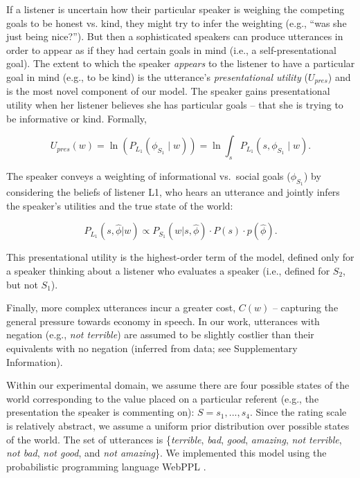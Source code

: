 \documentclass[9pt,twocolumn,twoside,lineno]{main_class_file}
\begin{document}
If a listener is uncertain how their particular speaker is weighing the competing goals to be honest vs. kind, they might try to infer the weighting (e.g., ``was she just being nice?''). 
But then a sophisticated speakers can produce utterances in order to appear as if they had certain goals in mind (i.e., a self-presentational goal). 
The extent to which the speaker \emph{appears} to the listener to have a particular goal in mind (e.g., to be kind) is the utterance's \emph{presentational utility} (\(U_{pres}\)) and is the most novel component of our model.
The speaker gains presentational utility when her listener believes she
has particular goals -- that she is trying to be informative or kind.
Formally,

\begin{equation}
U_{pres}(w) = \ln(P_{L_1}(\phi_{S_1} \mid w)) = \ln \int_s P_{L_1}(s, \phi_{S_1} \mid w).
\end{equation}

The speaker conveys a weighting of informational
vs.~social goals (\(\phi_{S_1}\)) by considering the
beliefs of listener L1, who hears an utterance and jointly infers
the speaker's utilities and the true state of the world:

\begin{equation}
P_{L_1}(s, \hat{\phi} | w) \propto P_{S_1}(w | s, \hat{\phi}) \cdot P(s) \cdot p(\hat{\phi}).
\end{equation}

This presentational utility is the highest-order term of the model, defined only for a speaker thinking about a listener who evaluates a speaker
(i.e., defined for \(S_2\), but not \(S_1\)).

Finally, more complex utterances incur a greater cost, \(C(w)\) --
capturing the general pressure towards economy in speech. In our work,
utterances with negation (e.g., \emph{not terrible}) are assumed to
be slightly costlier than their equivalents with no negation (inferred
from data; see Supplementary Information).

Within our experimental domain, we assume there are four possible states
of the world corresponding to the value placed on a particular referent
(e.g., the presentation the speaker is commenting on):
\(S = {s_1,...,s_4}\). Since the rating scale is relatively abstract, we assume a uniform prior distribution
over possible states of the world. The set of utterances is
\{\emph{terrible}, \emph{bad}, \emph{good}, \emph{amazing}, \emph{not
terrible}, \emph{not bad}, \emph{not good}, and \emph{not amazing}\}. We
implemented this model using the probabilistic programming language
WebPPL \cite{dippl}.
\end{document}
